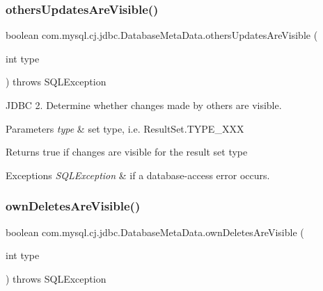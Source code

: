 \subsubsection{\texorpdfstring{others\+Updates\+Are\+Visible()}{othersUpdatesAreVisible()}}
{\footnotesize\ttfamily boolean com.\+mysql.\+cj.\+jdbc.\+Database\+Meta\+Data.\+others\+Updates\+Are\+Visible (\begin{DoxyParamCaption}\item[{int}]{type }\end{DoxyParamCaption}) throws S\+Q\+L\+Exception}

J\+D\+BC 2. Determine whether changes made by others are visible.


\begin{DoxyParams}{Parameters}
{\em type} & set type, i.\+e. Result\+Set.\+T\+Y\+P\+E\+\_\+\+X\+XX \\
\hline
\end{DoxyParams}
\begin{DoxyReturn}{Returns}
true if changes are visible for the result set type 
\end{DoxyReturn}

\begin{DoxyExceptions}{Exceptions}
{\em S\+Q\+L\+Exception} & if a database-\/access error occurs. \\
\hline
\end{DoxyExceptions}
\mbox{\label{classcom_1_1mysql_1_1cj_1_1jdbc_1_1_database_meta_data_a15c484885887bce87e58e9d72cfec7dc}} 
\subsubsection{\texorpdfstring{own\+Deletes\+Are\+Visible()}{ownDeletesAreVisible()}}
{\footnotesize\ttfamily boolean com.\+mysql.\+cj.\+jdbc.\+Database\+Meta\+Data.\+own\+Deletes\+Are\+Visible (\begin{DoxyParamCaption}\item[{int}]{type }\end{DoxyParamCaption}) throws S\+Q\+L\+Exception}


